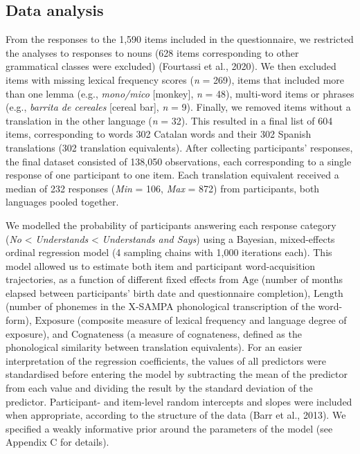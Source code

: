 \documentclass[
  man,
  floatsintext,
  colorlinks=true,linkcolor=blue,citecolor=blue,urlcolor=blue,biblatex]{apa7}
\begin{document}
\hypertarget{sec-analysis}{%
\subsection{Data analysis}\label{sec-analysis}}

From the responses to the 1,590 items included in the questionnaire, we
restricted the analyses to responses to nouns (628 items corresponding
to other grammatical classes were excluded) (Fourtassi et al., 2020). We
then excluded items with missing lexical frequency scores (\emph{n} =
269), items that included more than one lemma (e.g., \emph{mono/mico}
{[}monkey{]}, \emph{n} = 48), multi-word items or phrases (e.g.,
\emph{barrita de cereales} {[}cereal bar{]}, \emph{n} = 9). Finally, we
removed items without a translation in the other language (\emph{n} =
32). This resulted in a final list of 604 items, corresponding to words
302 Catalan words and their 302 Spanish translations (302 translation
equivalents). After collecting participants' responses, the final
dataset consisted of 138,050 observations, each corresponding to a
single response of one participant to one item. Each translation
equivalent received a median of 232 responses (\emph{Min} = 106,
\emph{Max} = 872) from participants, both languages pooled together.

We modelled the probability of participants answering each response
category (\emph{No} \textless{} \emph{Understands} \textless{}
\emph{Understands and Says}) using a Bayesian, mixed-effects ordinal
regression model (4 sampling chains with 1,000 iterations each). This
model allowed us to estimate both item and participant word-acquisition
trajectories, as a function of different fixed effects from
\(\text{Age}\) (number of months elapsed between participants' birth
date and questionnaire completion), \(\text{Length}\) (number of
phonemes in the X-SAMPA phonological transcription of the word-form),
\(\text{Exposure}\) (composite measure of lexical frequency and language
degree of exposure), and \(\text{Cognateness}\) (a measure of
cognateness, defined as the phonological similarity between translation
equivalents). For an easier interpretation of the regression
coefficients, the values of all predictors were standardised before
entering the model by subtracting the mean of the predictor from each
value and dividing the result by the standard deviation of the
predictor. Participant- and item-level random intercepts and slopes were
included when appropriate, according to the structure of the data (Barr
et al., 2013). We specified a weakly informative prior around the
parameters of the model (see Appendix C for details).
\end{document}
